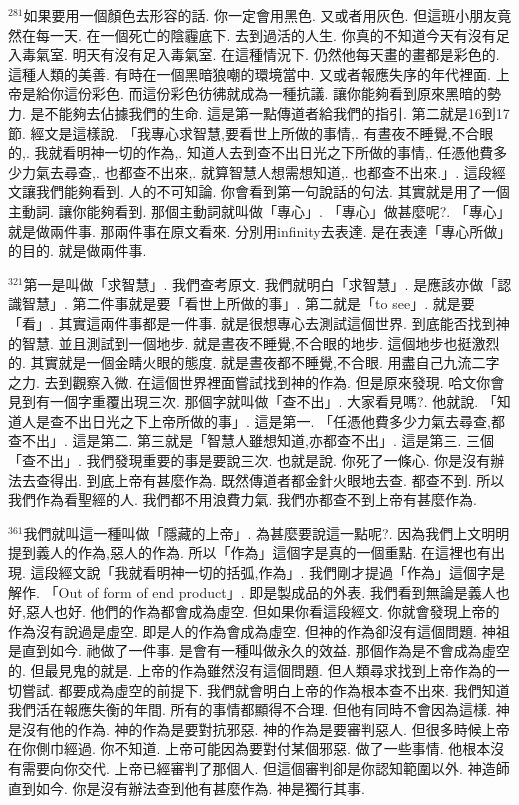 \documentclass{book}
\begin{document}
$^{281}$如果要用一個顏色去形容的話.
你一定會用黑色.
又或者用灰色.
但這班小朋友竟然在每一天.
在一個死亡的陰霾底下.
去到過活的人生.
你真的不知道今天有沒有足入毒氣室.
明天有沒有足入毒氣室.
在這種情況下.
仍然他每天畫的畫都是彩色的.
這種人類的美善.
有時在一個黑暗狼嘲的環境當中.
又或者報應失序的年代裡面.
上帝是給你這份彩色.
而這份彩色彷彿就成為一種抗議.
讓你能夠看到原來黑暗的勢力.
是不能夠去佔據我們的生命.
這是第一點傳道者給我們的指引.
第二就是16到17節.
經文是這樣說.
「我專心求智慧,要看世上所做的事情,.
有晝夜不睡覺,不合眼的,.
我就看明神一切的作為,.
知道人去到查不出日光之下所做的事情,.
任憑他費多少力氣去尋查,.
也都查不出來,.
就算智慧人想需想知道,.
也都查不出來.」.
這段經文讓我們能夠看到.
人的不可知論.
你會看到第一句說話的句法.
其實就是用了一個主動詞.
讓你能夠看到.
那個主動詞就叫做「專心」.
「專心」做甚麼呢?.
「專心」就是做兩件事.
那兩件事在原文看來.
分別用infinity去表達.
是在表達「專心所做」的目的.
就是做兩件事.

$^{321}$第一是叫做「求智慧」.
我們查考原文.
我們就明白「求智慧」.
是應該亦做「認識智慧」.
第二件事就是要「看世上所做的事」.
第二就是「to see」.
就是要「看」.
其實這兩件事都是一件事.
就是很想專心去測試這個世界.
到底能否找到神的智慧.
並且測試到一個地步.
就是晝夜不睡覺,不合眼的地步.
這個地步也挺激烈的.
其實就是一個金睛火眼的態度.
就是晝夜都不睡覺,不合眼.
用盡自己九流二字之力.
去到觀察入微.
在這個世界裡面嘗試找到神的作為.
但是原來發現.
哈文你會見到有一個字重覆出現三次.
那個字就叫做「查不出」.
大家看見嗎?.
他就說.
「知道人是查不出日光之下上帝所做的事」.
這是第一.
「任憑他費多少力氣去尋查,都查不出」.
這是第二.
第三就是「智慧人雖想知道,亦都查不出」.
這是第三.
三個「查不出」.
我們發現重要的事是要說三次.
也就是說.
你死了一條心.
你是沒有辦法去查得出.
到底上帝有甚麼作為.
既然傳道者都金針火眼地去查.
都查不到.
所以我們作為看聖經的人.
我們都不用浪費力氣.
我們亦都查不到上帝有甚麼作為.

$^{361}$我們就叫這一種叫做「隱藏的上帝」.
為甚麼要說這一點呢?.
因為我們上文明明提到義人的作為,惡人的作為.
所以「作為」這個字是真的一個重點.
在這裡也有出現.
這段經文說「我就看明神一切的括弧,作為」.
我們剛才提過「作為」這個字是解作.
「Out of form of end product」.
即是製成品的外表.
我們看到無論是義人也好,惡人也好.
他們的作為都會成為虛空.
但如果你看這段經文.
你就會發現上帝的作為沒有說過是虛空.
即是人的作為會成為虛空.
但神的作為卻沒有這個問題.
神祖是直到如今.
祂做了一件事.
是會有一種叫做永久的效益.
那個作為是不會成為虛空的.
但最見鬼的就是.
上帝的作為雖然沒有這個問題.
但人類尋求找到上帝作為的一切嘗試.
都要成為虛空的前提下.
我們就會明白上帝的作為根本查不出來.
我們知道我們活在報應失衡的年間.
所有的事情都顯得不合理.
但他有同時不會因為這樣.
神是沒有他的作為.
神的作為是要對抗邪惡.
神的作為是要審判惡人.
但很多時候上帝在你側巾經過.
你不知道.
上帝可能因為要對付某個邪惡.
做了一些事情.
他根本沒有需要向你交代.
上帝已經審判了那個人.
但這個審判卻是你認知範圍以外.
神造師直到如今.
你是沒有辦法查到他有甚麼作為.
神是獨行其事.
\end{document}
